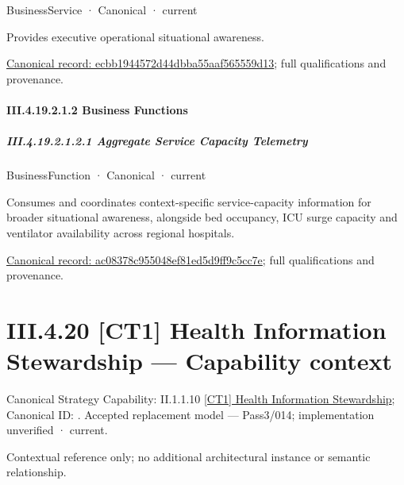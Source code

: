 \label{element:ecbb1944572d44dbba55aaf565559d13}
{\small BusinessService · Canonical · current}\par

Provides executive operational situational awareness.


{\footnotesize \href{../../../../../../../../continuum/business/business-service/ecbb1944572d44dbba55aaf565559d13.md}{Canonical record: ecbb1944572d44dbba55aaf565559d13}; full qualifications and provenance.}\par
\paragraph*{III.4.19.2.1.2 Business Functions}
\label{navigation:III.4.19.2.1.2}

\subparagraph*{III.4.19.2.1.2.1 Aggregate Service Capacity Telemetry}
\label{navigation:III.4.19.2.1.2.1}

\label{element:ac08378c955048ef81ed5d9ff9c5cc7e}
{\small BusinessFunction · Canonical · current}\par

Consumes and coordinates context-specific service-capacity information for broader situational awareness, alongside bed occupancy, ICU surge capacity and ventilator availability across regional hospitals.


{\footnotesize \href{../../../../../../../../continuum/business/business-function/ac08378c955048ef81ed5d9ff9c5cc7e.md}{Canonical record: ac08378c955048ef81ed5d9ff9c5cc7e}; full qualifications and provenance.}\par
\section*{III.4.20 [CT1] Health Information Stewardship — Capability context}
\label{navigation:III.4.20}

{\small Canonical Strategy Capability: II.1.1.10 \hyperref[element:3ed66006b3424bc086180c6738b1596d]{[CT1] Health Information Stewardship}; Canonical ID: \texttt{}. Accepted replacement model — Pass3/014; implementation unverified · current.}\par
Contextual reference only; no additional architectural instance or semantic relationship.\par
